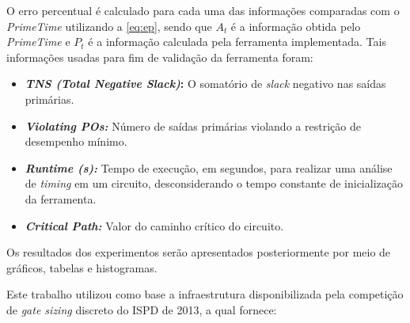 \documentclass[
	12pt,				%
	openright,			%
	twoside,			%
	a4paper,			%
	english,			%
	french,				%
	spanish,			%
	brazil,				%
	]{abntex2}
\begin{document}
O erro percentual é calculado para cada uma das informações comparadas com o \textit{PrimeTime} utilizando a \autoref{eq:ep}, sendo que $A_t$ é a informação obtida pelo \textit{PrimeTime} e $P_t$ é a informação calculada pela ferramenta implementada. Tais informações usadas para fim de validação da ferramenta foram:

\begin{itemize}
\item \textbf{\textit{TNS (Total Negative Slack)}: } O somatório de \textit{slack} negativo nas saídas primárias.

\item \textbf{\textit{Violating POs: }} Número de saídas primárias violando a restrição de desempenho mínimo.

\item \textbf{\textit{Runtime (s): }} Tempo de execução, em segundos, para realizar uma análise de \textit{timing} em um circuito, desconsiderando o tempo constante de inicialização da ferramenta.

\item \textbf{\textit{Critical Path: }} Valor do caminho crítico do circuito.
\end{itemize}

Os resultados dos experimentos serão apresentados posteriormente por meio de gráficos, tabelas e histogramas.

Este trabalho utilizou como base a infraestrutura disponibilizada pela competição de \textit{gate sizing} discreto do ISPD de 2013, a qual fornece:
\end{document}
